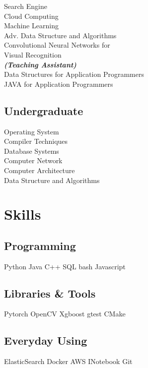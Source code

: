 \documentclass[letterpaper]{deedy-resume} %
\begin{document}
\begin{minipage}[t]{0.33\textwidth}
Search Engine \\
Cloud Computing \\
Machine Learning \\
Adv. Data Structure and Algorithms \\
Convolutional Neural Networks for \\
Visual Recognition \\

{\footnotesize \textit{\textbf{(Teaching Assistant) }}} \\
Data Structures for Application Programmers \\
JAVA for Application Programmers

\sectionspace %


\subsection{Undergraduate}

Operating System \\
Compiler Techniques \\
Database Systems \\
Computer Network \\
Computer Architecture \\
Data Structure and Algorithms \\

\sectionspace %


\section{Skills}

\subsection{Programming}
Python \textbullet{} Java \textbullet{} C++  \textbullet{} SQL \textbullet{} bash \textbullet{} Javascript
\sectionspace 
\subsection{Libraries \& Tools}
Pytorch \textbullet{} OpenCV \textbullet{} Xgboost \textbullet{} gtest \textbullet{} CMake
\sectionspace
\subsection{Everyday Using}
ElasticSearch \textbullet{} Docker \textbullet{} AWS \textbullet{} INotebook \textbullet{} Git

\sectionspace %


\end{minipage} %
\end{document}

